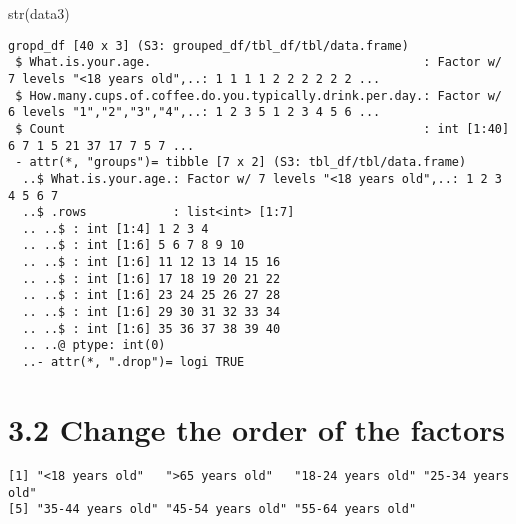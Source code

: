 \documentclass[
  letterpaper,
  DIV=11,
  numbers=noendperiod]{scrreprt}
\newenvironment{Shaded}{\begin{snugshade}}{\end{snugshade}}
\newcommand{\FunctionTok}[1]{\textcolor[rgb]{0.28,0.35,0.67}{#1}}
\newcommand{\NormalTok}[1]{\textcolor[rgb]{0.00,0.23,0.31}{#1}}
\newcommand{\SpecialCharTok}[1]{\textcolor[rgb]{0.37,0.37,0.37}{#1}}
\begin{document}
\begin{Shaded}
\begin{Highlighting}[]
\FunctionTok{str}\NormalTok{(data3)}
\end{Highlighting}
\end{Shaded}

\begin{verbatim}
gropd_df [40 x 3] (S3: grouped_df/tbl_df/tbl/data.frame)
 $ What.is.your.age.                                      : Factor w/ 7 levels "<18 years old",..: 1 1 1 1 2 2 2 2 2 2 ...
 $ How.many.cups.of.coffee.do.you.typically.drink.per.day.: Factor w/ 6 levels "1","2","3","4",..: 1 2 3 5 1 2 3 4 5 6 ...
 $ Count                                                  : int [1:40] 6 7 1 5 21 37 17 7 5 7 ...
 - attr(*, "groups")= tibble [7 x 2] (S3: tbl_df/tbl/data.frame)
  ..$ What.is.your.age.: Factor w/ 7 levels "<18 years old",..: 1 2 3 4 5 6 7
  ..$ .rows            : list<int> [1:7] 
  .. ..$ : int [1:4] 1 2 3 4
  .. ..$ : int [1:6] 5 6 7 8 9 10
  .. ..$ : int [1:6] 11 12 13 14 15 16
  .. ..$ : int [1:6] 17 18 19 20 21 22
  .. ..$ : int [1:6] 23 24 25 26 27 28
  .. ..$ : int [1:6] 29 30 31 32 33 34
  .. ..$ : int [1:6] 35 36 37 38 39 40
  .. ..@ ptype: int(0) 
  ..- attr(*, ".drop")= logi TRUE
\end{verbatim}

\hypertarget{change-the-order-of-the-factors}{%
\section{3.2 Change the order of the
factors}\label{change-the-order-of-the-factors}}

\begin{Shaded}
\end{Shaded}

\begin{verbatim}
[1] "<18 years old"   ">65 years old"   "18-24 years old" "25-34 years old"
[5] "35-44 years old" "45-54 years old" "55-64 years old"
\end{verbatim}
\end{document}
